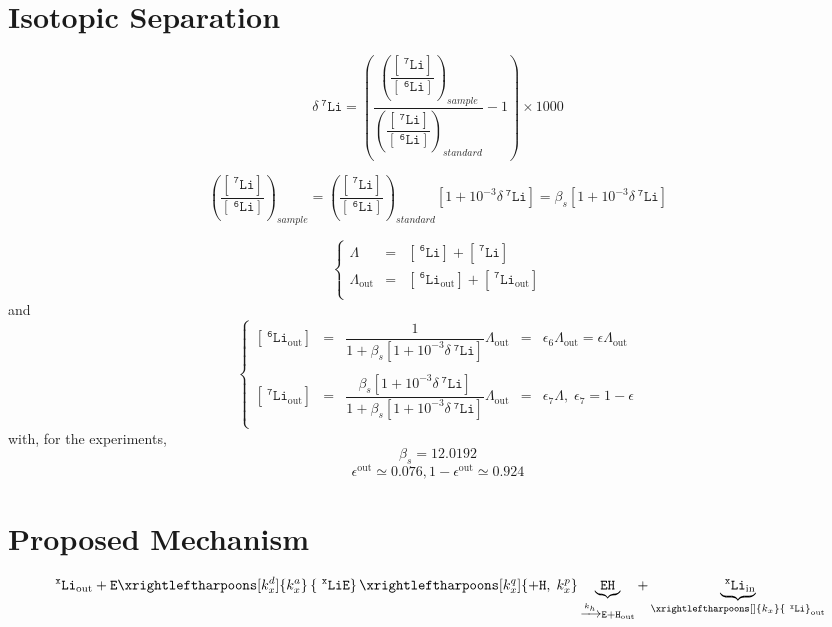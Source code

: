 \documentclass[aps,onecolumn,12pt]{revtex4}
\newcommand{\mychem}[1]{\mathtt{#1}}
\newcommand{\myconc}[1]{\left\lbrack{#1}\right\rbrack}
\newcommand{\spLi}[1]{{~^{\mychem{#1}}\mychem{Li}}}
\newcommand{\Li}[1]{\myconc{\spLi{#1}}}
\newcommand{\spEout}{\mychem{E}}
\newcommand{\spLiE}[1]{\left\lbrace\spLi{#1}\spEout\right\rbrace}
\newcommand{\spLiIn}[1]{{\spLi{#1}}_{\mathrm{in}}}
\newcommand{\spLiOut}[1]{{\spLi{#1}}_{\mathrm{out}}}
\newcommand{\LiOut}[1]{\myconc{\spLiOut{#1}}}
\newcommand{\spEHin}{\mychem{EH}}
\newcommand{\deltaLi}{ {\delta\!\!\!\spLi{7}} }
\newcommand{\LiAll}{\Lambda}
\newcommand{\LiAllOut}{{\LiAll}_{\mathrm{out}}}
\begin{document}
\section{Isotopic Separation}
$$
	\deltaLi = \left(
		\dfrac{\left(\dfrac{\Li{7}}{\Li{6}}\right)_{sample}}
		{\left(\dfrac{\Li{7}}{\Li{6}}\right)_{standard}}
		 -1 
	\right) \times 1000
$$

$$
	\left(\dfrac{\Li{7}}{\Li{6}}\right)_{sample} = \left(\dfrac{\Li{7}}{\Li{6}}\right)_{standard} \left[1+10^{-3}\deltaLi\right] = \beta_s \left[1+10^{-3}\deltaLi\right]
$$

\begin{equation}
\left\lbrace
\begin{array}{rcl}
	\LiAll    & = & \Li{6} + \Li{7}\\
	\LiAllOut & = & \LiOut{6} + \LiOut{7}\\
\end{array}
\right.
\end{equation}
and
\begin{equation}
\left\lbrace
\begin{array}{rclcl}
	\LiOut{6} & = & \dfrac{1}{1+\beta_s \left[1+10^{-3}\deltaLi\right] } \LiAllOut & = & \epsilon_6 \LiAllOut  = \epsilon \LiAllOut \\
	\\
	\LiOut{7} & = & \dfrac{\beta_s \left[1+10^{-3}\deltaLi\right]}{1+\beta_s \left[1+10^{-3}\deltaLi\right] } \LiAllOut & = & \epsilon_7 \LiAll,\;\epsilon_7 = 1-\epsilon \\
\end{array}
\right.
\end{equation}
with, for the experiments,
\begin{equation}
	\beta_s = 12.0192
\end{equation}
\begin{equation}
	\epsilon^\mathrm{out} \simeq 0.076, 1-\epsilon^\mathrm{out} \simeq 0.924
\end{equation}

\section{Proposed Mechanism}

\begin{equation}
	 \spLiOut{x} +  \spEout  
	 \xrightleftharpoons[k_x^d]{k_x^a} 
	 \spLiE{x}
	  \xrightleftharpoons[k_x^q]{\mychem{+H},\;k_x^p} \underbrace{\spEHin}_{\xrightarrow[]{k_h} \mychem{E} + \mychem{H}_{\mathrm{out}}} + \underbrace{\spLiIn{x}}_{\xrightleftharpoons[]{k_x} \spLiOut{x}}
\end{equation}
\end{document}
